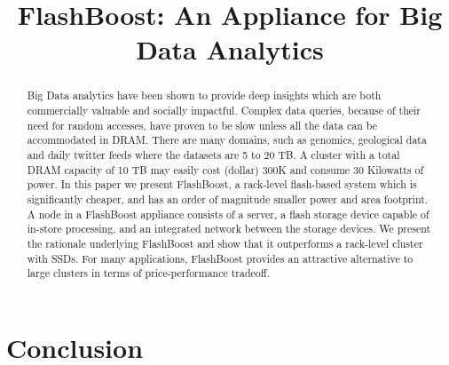 \documentclass[pageno]{jpaper}
\begin{document}
\title{
FlashBoost: An Appliance for Big Data Analytics
}

\date{}
\maketitle


\begin{abstract}
Big Data analytics have been shown to provide deep insights which are both
commercially valuable and socially impactful. Complex data queries, because of
their need for random accesses, have proven to be slow unless all the data can
be accommodated in DRAM. There are many domains, such as genomics, geological
data and daily twitter feeds where the datasets are 5 to 20 TB. A cluster with a
total DRAM capacity of 10 TB may easily cost (dollar) 300K and consume 30
Kilowatts of power. In this paper we present FlashBoost, a rack-level
flash-based system which is significantly cheaper, and has an order of magnitude
smaller power and area footprint. A node in a FlashBoost appliance consists of a
server, a flash storage device capable of in-store processing, and an integrated
network between the storage devices. We present the rationale underlying
FlashBoost and show that it outperforms a rack-level cluster with SSDs. For many
applications, FlashBoost provides an attractive alternative to large clusters in
terms of price-performance tradeoff.
\end{abstract}



%







\section{Conclusion}



\end{document}
